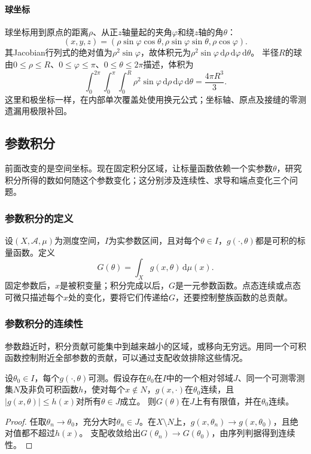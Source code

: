 \paragraph{球坐标}

球坐标用到原点的距离$\rho$、从正$z$轴量起的夹角$\varphi$和绕$z$轴的角$\theta$：
\[
 (x,y,z)=(\rho\sin\varphi\cos\theta,\rho\sin\varphi\sin\theta,\rho\cos\varphi).
\]
其Jacobian行列式的绝对值为$\rho^2\sin\varphi$，故体积元为$\rho^2\sin\varphi\,\mathrm d\rho\,\mathrm d\varphi\,\mathrm d\theta$。
半径$R$的球由$0\leq\rho\leq R$、$0\leq\varphi\leq\pi$、$0\leq\theta\leq2\pi$描述，体积为
\[
 \int_0^{2\pi}\int_0^\pi\int_0^R\rho^2\sin\varphi\,\mathrm d\rho\,\mathrm d\varphi\,\mathrm d\theta
 =\frac{4\pi R^3}{3}.
\]
这里和极坐标一样，在内部单次覆盖处使用换元公式；坐标轴、原点及接缝的零测遗漏用极限补回。

\subsection{参数积分}
\label{sec:multivariable-parameter-integrals}

前面改变的是空间坐标。现在固定积分区域，让标量函数依赖一个实参数$\theta$，研究积分所得的数如何随这个参数变化；这分别涉及连续性、求导和端点变化三个问题。

\subsubsection{参数积分的定义}

设$(X,\mathcal A,\mu)$为测度空间，$I$为实参数区间，且对每个$\theta\in I$，$g(\cdot,\theta)$都是可积的标量函数。定义
\[
 G(\theta)=\int_Xg(x,\theta)\,\mathrm d\mu(x).
\]
固定参数后，$x$是被积变量；积分完成以后，$G$是一元参数函数。点态连续或点态可微只描述每个$x$处的变化，要将它们传递给$G$，还要控制整族函数的总贡献。

\subsubsection{参数积分的连续性}

参数趋近时，积分贡献可能集中到越来越小的区域，或移向无穷远。用同一个可积函数控制附近全部参数的贡献，可以通过支配收敛排除这些情况。
\begin{theorem}[可积控制下参数积分的连续性]
设$\theta_0\in I$，每个$g(\cdot,\theta)$可测。假设存在$\theta_0$在$I$中的一个相对邻域$J$、同一个可测零测集$N$及非负可积函数$h$，使对每个$x\notin N$，$g(x,\cdot)$在$\theta_0$连续，且
$|g(x,\theta)|\leq h(x)$对所有$\theta\in J$成立。
则$G(\theta)$在$J$上有有限值，并在$\theta_0$连续。
\end{theorem}
\begin{proof}
任取$\theta_n\to\theta_0$，充分大时$\theta_n\in J$。在$X\setminus N$上，$g(x,\theta_n)\to g(x,\theta_0)$，且绝对值都不超过$h(x)$。
支配收敛给出$G(\theta_n)\to G(\theta_0)$，由序列判据得到连续性。
\end{proof}

